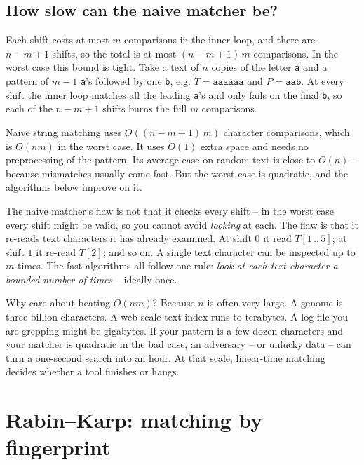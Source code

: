 \subsection{How slow can the naive matcher be?}

Each shift costs at most $m$ comparisons in the inner loop, and there are
$n-m+1$ shifts, so the total is at most $(n-m+1)\,m$ comparisons. In the worst
case this bound is tight. Take a text of $n$ copies of the letter \texttt{a} and
a pattern of $m-1$ \texttt{a}'s followed by one \texttt{b}, e.g.
$T=\texttt{aaaaaa}$ and $P=\texttt{aab}$. At every shift the inner loop matches
all the leading \texttt{a}'s and only fails on the final \texttt{b}, so each of
the $n-m+1$ shifts burns the full $m$ comparisons.

\begin{complexitybox}
Naive string matching uses $O((n-m+1)\,m)$ character comparisons, which is
$O(nm)$ in the worst case. It uses $O(1)$ extra space and needs no preprocessing
of the pattern. Its average case on random text is close to
$O(n)$ -- because mismatches usually come fast. But the worst case is
quadratic, and the algorithms below improve on it.
\end{complexitybox}

\begin{trapbox}
The naive matcher's flaw is not that it checks every shift -- in the worst case
every shift might be valid, so you cannot avoid \emph{looking} at each.
The flaw is that it re-reads text characters it has already examined. At shift
$0$ it read $T[1\,..\,5]$; at shift $1$ it re-read $T[2]$; and so on. A single
text character can be inspected up to $m$ times. The fast algorithms all follow
one rule: \emph{look at each text character a bounded number of times} --
ideally once.
\end{trapbox}

\begin{aestheticbox}
Why care about beating $O(nm)$? Because $n$ is often very large. A genome is three
billion characters. A web-scale text index runs to terabytes. A log file you are
grepping might be gigabytes. If your pattern is a few dozen characters and your
matcher is quadratic in the bad case, an adversary -- or unlucky data -- can
turn a one-second search into an hour. At that scale, linear-time
matching decides whether a tool finishes or hangs.
\end{aestheticbox}

\section{Rabin--Karp: matching by fingerprint}
\label{ch31:rabinkarp}

